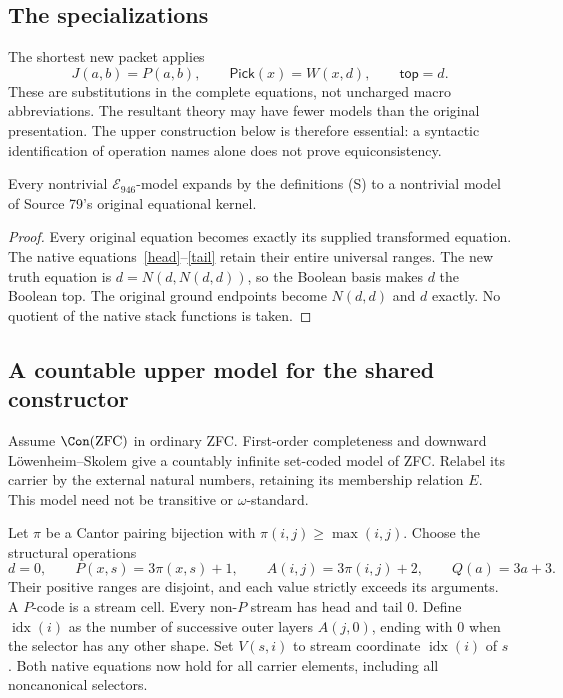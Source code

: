 \subsection{The specializations}

The shortest new packet applies
\[
             J(a,b)=P(a,b),\qquad
             \mathsf{Pick}(x)=W(x,d),\qquad
             \mathsf{top}=d.                     \tag{S}
\]
These are substitutions in the complete equations, not uncharged macro
abbreviations. The resultant theory may have fewer models than the original
presentation. The upper construction below is therefore essential: a
syntactic identification of operation names alone does not prove
equiconsistency.

\begin{lemma}
Every nontrivial $\mathcal E_{946}$-model expands by the definitions (S)
to a nontrivial model of Source 79's original equational kernel.
\end{lemma}
\begin{proof}
Every original equation becomes exactly its supplied transformed equation.
The native equations~\eqref{head}--\eqref{tail} retain their entire
universal ranges. The new truth equation is
$d=N(d,N(d,d))$, so the Boolean basis makes $d$ the Boolean top. The
original ground endpoints become $N(d,d)$ and $d$ exactly. No quotient of
the native stack functions is taken.
\end{proof}

\subsection{A countable upper model for the shared constructor}

Assume $\Con(\mathrm{ZFC})$ in ordinary ZFC. First-order completeness
and downward L\"owenheim--Skolem give a countably infinite set-coded model
of ZFC. Relabel its carrier by the external natural numbers, retaining its
membership relation $E$. This model need not be transitive or
$\omega$-standard.

Let $\pi$ be a Cantor pairing bijection with
$\pi(i,j)\geq\max(i,j)$. Choose the structural operations
\[
 d=0,\qquad P(x,s)=3\pi(x,s)+1,\qquad
 A(i,j)=3\pi(i,j)+2,\qquad Q(a)=3a+3.
\]
Their positive ranges are disjoint, and each value strictly exceeds its
arguments. A $P$-code is a stream cell. Every non-$P$ stream has head and
tail 0. Define $\operatorname{idx}(i)$ as the number of successive outer
layers $A(j,0)$, ending with 0 when the selector has any other shape.
Set $V(s,i)$ to stream coordinate $\operatorname{idx}(i)$ of $s$.
Both native equations now hold for all carrier elements, including all
noncanonical selectors.

